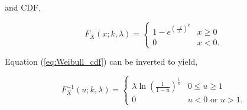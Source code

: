 \documentclass[12pt]{article}
\begin{document}
and CDF,

\begin{equation}
\label{eq:Weibull_cdf}
F_X(x; k, \lambda) =
\begin{cases}
1 - e^{\left(\frac{-x}{\lambda}\right)^k} & x \geq 0 \\
0 & x < 0.
\end{cases}
\end{equation}

Equation (\ref{eq:Weibull_cdf}) can be inverted to yield,

\begin{equation}
\label{eq:Weibull_inverse_cdf}
F_X^{-1}(u; k, \lambda) =
\begin{cases}
\lambda\ln\left(\frac{1}{1 - u}\right)^{\frac{1}{k}} & 0 \leq u \geq 1 \\
0 & u < 0 \text{ or } u > 1.
\end{cases}
\end{equation}
\end{document}
